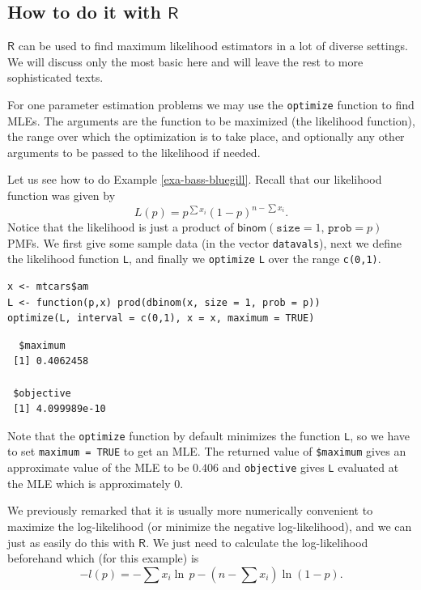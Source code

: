 \documentclass[captions=tableheading]{scrbook}
\begin{document}
\subsection{How to do it with \(\mathsf{R}\)}
\label{sec-9-1-1}


\(\mathsf{R}\) can be used to find maximum likelihood estimators in a lot of diverse settings. We will discuss only the most basic here and will leave the rest to more sophisticated texts.

For one parameter estimation problems we may use the \texttt{optimize} function to find MLEs. The arguments are the function to be maximized (the likelihood function), the range over which the optimization is to take place, and optionally any other arguments to be passed to the likelihood if needed.

Let us see how to do Example \ref{exa-bass-bluegill}. Recall that our likelihood function was given by
\begin{equation}
L(p)=p^{\sum x_{i}}(1-p)^{n-\sum x_{i}}.
\end{equation}
Notice that the likelihood is just a product of \(\mathsf{binom}(\mathtt{size}=1,\,\mathtt{prob}=p)\) PMFs. We first give some sample data (in the vector \texttt{datavals}), next we define the likelihood function \texttt{L}, and finally we \texttt{optimize} \texttt{L} over the range \texttt{c(0,1)}.


\lstset{language=R}
\begin{lstlisting}
x <- mtcars$am
L <- function(p,x) prod(dbinom(x, size = 1, prob = p))
optimize(L, interval = c(0,1), x = x, maximum = TRUE)
\end{lstlisting}

\begin{verbatim}
  $maximum
 [1] 0.4062458
 
 $objective
 [1] 4.099989e-10
\end{verbatim}



Note that the \texttt{optimize} function by default minimizes the function \texttt{L}, so we have to set \texttt{maximum = TRUE} to get an MLE. The returned value of \texttt{\$maximum} gives an approximate value of the MLE to be \(  0.406 \) and \texttt{objective} gives \texttt{L} evaluated at the MLE which is approximately \(  0 \).

We previously remarked that it is usually more numerically convenient to maximize the log-likelihood (or minimize the negative log-likelihood), and we can just as easily do this with \(\mathsf{R}\). We just need to calculate the log-likelihood beforehand which (for this example) is
\[
-l(p)=-\sum x_{i}\ln\, p-\left(n-\sum x_{i}\right)\ln(1-p).
\]
\end{document}
